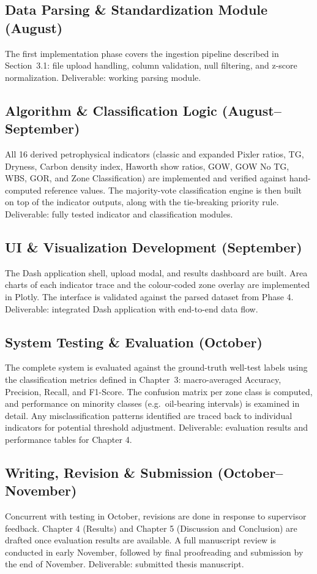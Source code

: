 \subsection*{Data Parsing \& Standardization Module (August)}
The first implementation phase covers the ingestion pipeline described in
Section~3.1: file upload handling, column validation, null filtering, and
z-score normalization.
Deliverable: working parsing module.

\subsection*{Algorithm \& Classification Logic (August--September)}
All 16 derived petrophysical indicators (classic and expanded Pixler ratios, TG, Dryness, Carbon density index, Haworth show ratios, GOW, GOW No TG, WBS, GOR, and Zone Classification) are implemented and verified against hand-computed reference values. The majority-vote classification engine is then built on top of the indicator outputs, along with the tie-breaking priority rule.
Deliverable: fully tested indicator and classification modules.

\subsection*{UI \& Visualization Development (September)}
The Dash application shell, upload modal, and results dashboard are built.
Area charts of each indicator trace and the colour-coded zone overlay are
implemented in Plotly. The interface is validated against the parsed dataset
from Phase 4.
Deliverable: integrated Dash application with end-to-end data flow.

\subsection*{System Testing \& Evaluation (October)}
The complete system is evaluated against the ground-truth well-test labels
using the classification metrics defined in Chapter~3: macro-averaged
Accuracy, Precision, Recall, and F1-Score. The confusion matrix per zone
class is computed, and performance on minority classes (e.g.\ oil-bearing
intervals) is examined in detail. Any misclassification patterns identified
are traced back to individual indicators for potential threshold adjustment.
Deliverable: evaluation results and performance tables for Chapter 4.

\subsection*{Writing, Revision \& Submission (October--November)}
Concurrent with testing in October, revisions are done in response
to supervisor feedback. Chapter 4 (Results) and Chapter 5 (Discussion and
Conclusion) are drafted once evaluation results are available. A full
manuscript review is conducted in early November, followed by final
proofreading and submission by the end of November.
Deliverable: submitted thesis manuscript.

